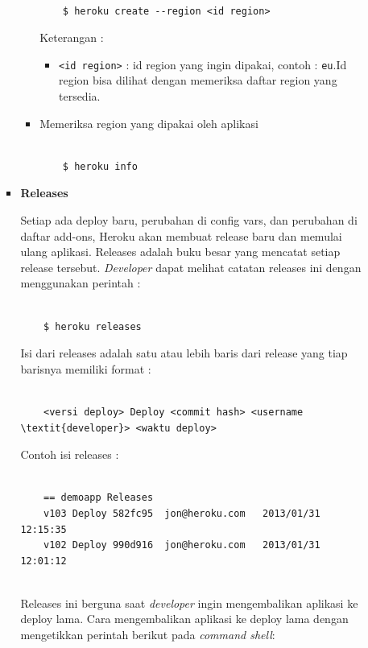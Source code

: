 \documentclass[a4paper,twoside]{article}
\begin{document}
\begin{enumerate}
\begin{enumerate}
\begin{itemize}
\begin{itemize}
\begin{lstlisting}

	$ heroku create --region <id region>

\end{lstlisting}
Keterangan :
\begin{itemize}
\item \texttt{<id region>} : id region yang ingin dipakai, contoh : \texttt{eu}.Id region bisa dilihat dengan memeriksa daftar region yang tersedia.
\end{itemize}

\item Memeriksa region yang dipakai oleh aplikasi

\begin{lstlisting}

	$ heroku info

\end{lstlisting}

\end{itemize}
		
				\item \textbf{Releases}
		
				Setiap ada deploy baru, perubahan di config vars, dan perubahan di daftar add-ons, Heroku akan membuat release baru dan memulai ulang aplikasi. Releases adalah buku besar yang mencatat setiap release tersebut. \textit{Developer} dapat melihat catatan releases ini dengan menggunakan perintah :
\begin{lstlisting}

	$ heroku releases

\end{lstlisting}

Isi dari releases adalah satu atau lebih baris dari release yang tiap barisnya memiliki format : 
\begin{lstlisting}

	<versi deploy> Deploy <commit hash> <username \textit{developer}> <waktu deploy> 

\end{lstlisting}

Contoh isi releases :
\begin{lstlisting}

	== demoapp Releases
	v103 Deploy 582fc95  jon@heroku.com   2013/01/31 12:15:35
	v102 Deploy 990d916  jon@heroku.com   2013/01/31 12:01:12
	
\end{lstlisting}

Releases ini berguna saat \textit{developer} ingin mengembalikan aplikasi ke deploy lama. Cara mengembalikan aplikasi ke deploy lama dengan mengetikkan perintah berikut pada \textit{command shell}:
\begin{lstlisting}


\end{lstlisting}
\end{itemize}
\end{enumerate}
\end{enumerate}
\end{document}
